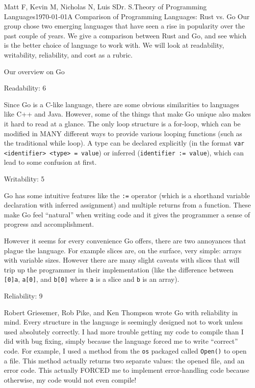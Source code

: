 \documentclass[12pt,letterpaper]{article}
\begin{document}
\begin{mla}{Matt F, Kevin M, Nicholas N, Luis S}{}{Dr. S.}{Theory of Programming Languages}{\today}{A Comparison of Programming Languages: Rust vs. Go}
Our group chose two emerging languages that have seen a rise in popularity over the past couple of years. We give a comparison between Rust and Go, and see which is the better choice of language to work with. We will look at readability, writability, reliability, and cost as a rubric. 

Our overview on Go
      
Readability: 6

Since Go is a C-like language, there are some obvious similarities to languages like C++ and Java. However, some of the things that make Go unique also makes it hard to read at a glance. The only loop structure is a for-loop, which can be modified in MANY different ways to provide various looping functions (such as the traditional while loop). A type can be declared explicitly (in the format \texttt{var <identifier> <type> = value}) or inferred (\texttt{identifier := value}), which can lead to some confusion at first.

Writability: 5

Go has some intuitive features like the \texttt{:=} operator (which is a shorthand variable declaration with inferred assignment) and multiple returns from a function. These make Go feel ``natural'' when writing code and it gives the programmer a sense of progress and accomplishment.

However it seems for every convenience Go offers, there are two annoyances that plague the language. For example slices are, on the surface, very simple: arrays with variable sizes. However there are many slight caveats with slices that will trip up the programmer in their implementation (like the difference between \texttt{[0]a}, \texttt{a[0]}, and \texttt{b[0]} where \texttt{a} is a slice and \texttt{b} is an array).

Reliability: 9

Robert Griesemer, Rob Pike, and Ken Thompson wrote Go with reliability in mind. Every structure in the language is seemingly designed not to work unless used absolutely correctly. I had more trouble getting my code to compile than I did with bug fixing, simply because the language forced me to write ``correct'' code. For example, I used a method from the \texttt{os} packaged called \texttt{Open()} to open a file. This method actually returns two separate values: the opened file, and an error code. This actually FORCED me to implement error-handling code because otherwise, my code would not even compile!


\end{mla}
\end{document}
